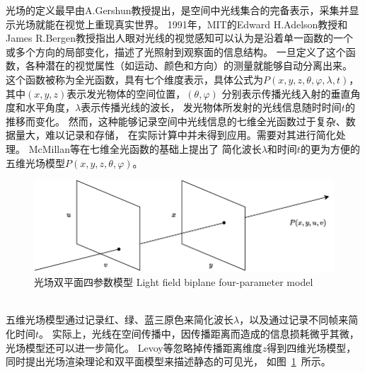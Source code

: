 \label{chap:part2}
光场的定义最早由A.Gershun教授提出，是空间中光线集合的完备表示，采集并显示光场就能在视觉上重现真实世界。
1991年，MIT的Edward H.Adelson教授和James R.Bergen教授指出人眼对光线的视觉感知可以认为是沿着单一函数的一个或多个方向的局部变化，描述了光照射到观察面的信息结构。
一旦定义了这个函数，各种潜在的视觉属性（如运动、颜色和方向）的测量就能够自动分离出来。
这个函数被称为全光函数，具有七个维度表示，具体公式为$P(x,y,z,\theta,\varphi,\lambda,t)$，
其中$(x,y,z)$表示发光物体的空间位置，$(\theta,\varphi)$
分别表示传播光线入射的垂直角度和水平角度，$\lambda$表示传播光线的波长，
发光物体所发射的光线信息随时时间$t$的推移而变化。
然而，这种能够记录空间中光线信息的七维全光函数过于复杂、数据量大，难以记录和存储，
在实际计算中并未得到应用。需要对其进行简化处理。
McMillan等在七维全光函数的基础上提出了
简化波长$\lambda$和时间$t$的更为方便的五维光场模型$P(x,y,z,\theta,\varphi)$。
\begin{figure}[b]
	\centering
	\includegraphics[width=1\linewidth]{figures/chapter2/double_plane_model.drawio}
	\bicaption
	{光场双平面四参数模型}
	{Light field biplane four-parameter model}  
	\label{chapter2_fig1:double_plane}
\end{figure}
\\
%
%
%
%
\indent
五维光场模型通过记录红、绿、蓝三原色来简化波长$\lambda$，以及通过记录不同帧来简化时间$t$。
实际上，光线在空间传播中，因传播距离而造成的信息损耗微乎其微，光场模型还可以进一步简化。
Levoy等忽略掉传播距离维度$z$得到四维光场模型，
同时提出光场渲染理论和双平面模型来描述静态的可见光，
如图~\ref{chapter2_fig1:double_plane}~所示。
